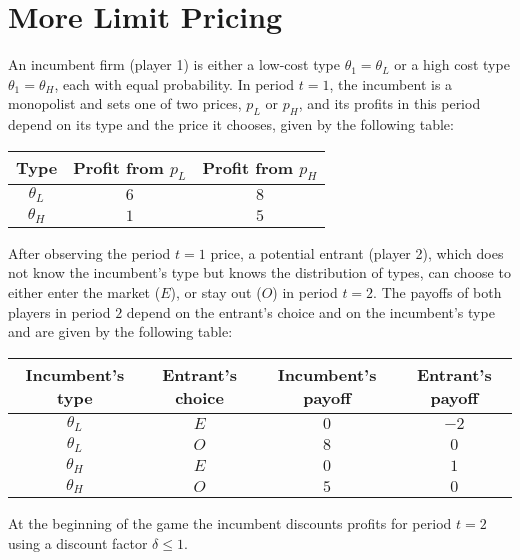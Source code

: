 \documentclass[10pt]{extarticle}
\title{}
\author{}
\date{}
\begin{document}
\section{More Limit Pricing}%
  An incumbent firm (player 1) is either a low-cost type $\theta_1 = \theta_L$ or a high cost type $\theta_1 = \theta_H$, each with equal probability. In period $t=1$, the incumbent is a monopolist and sets one of two prices, $p_L$ or $p_H$, and its profits in this period depend on its type and the price it chooses, given by the following table:
  \begin{center}
    \begin{tabular}{ccc}
      Type & Profit from $p_L$ & Profit from $p_H$\\
      \hline
      $\theta_L$ & $6$ & $8$\\
      $\theta_H$ & $1$ & $5$
    \end{tabular}
  \end{center}
  After observing the period $t=1$ price, a potential entrant (player 2), which does not know the incumbent's type but knows the distribution of types, can choose to either enter the market ($E$), or stay out ($O$) in period $t=2$. The payoffs of both players in period $2$ depend on the entrant's choice and on the incumbent's type and are given by the following table:
  \begin{center}
    \begin{tabular}{cccc}
      Incumbent's type & Entrant's choice & Incumbent's payoff & Entrant's payoff\\
      \hline
      $\theta_L$ & $E$ & $0$ & $-2$\\
      $\theta_L$ & $O$ & $8$ & $0$\\
      $\theta_H$ & $E$ & $0$ & $1$\\
      $\theta_H$ & $O$ & $5$ & $0$
    \end{tabular}
  \end{center}
  At the beginning of the game the incumbent discounts profits for period $t=2$ using a discount factor $\delta \leq 1$.
\end{document}
